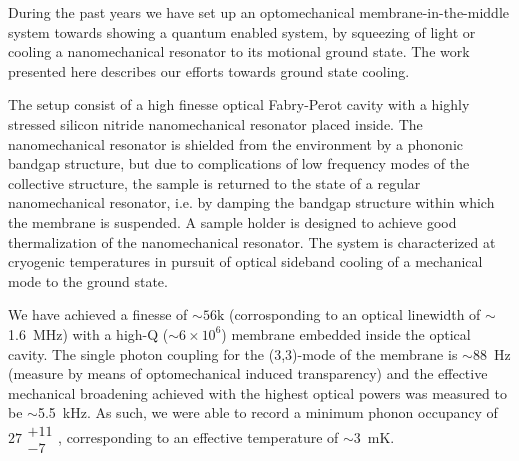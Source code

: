 During the past years we have set up an optomechanical membrane-in-the-middle system towards showing a quantum enabled system, by squeezing of light or cooling a nanomechanical resonator to its motional ground state. The work presented here describes our efforts towards ground state cooling.

The setup consist of a high finesse optical Fabry-Perot cavity with a highly stressed silicon nitride nanomechanical resonator placed inside. The nanomechanical resonator is shielded from the environment by a phononic bandgap structure, but due to complications of low frequency modes of the collective structure, the sample is returned to the state of a regular nanomechanical resonator, i.e. by damping the bandgap structure within which the membrane is suspended. A sample holder is designed to achieve good thermalization of the nanomechanical resonator. The system is characterized at cryogenic temperatures in pursuit of optical sideband cooling of a mechanical mode to the ground state.

We have achieved a finesse of $\sim56\mathrm{k}$ (corrosponding to an optical linewidth of $\sim$\SI{1.6}{\mega\hertz}) with a high-Q ($\sim6\times10^6$) membrane embedded inside the optical cavity. The single photon coupling for the (3,3)-mode of the membrane is $\sim$\SI{88}{\hertz} (measure by means of optomechanical induced transparency) and the effective mechanical broadening achieved with the highest optical powers was measured to be $\sim$\SI{5.5}{\kilo\hertz}. As such, we were able to record a minimum phonon occupancy of $27\substack{+11 \\ -7}$, corresponding to an effective temperature of $\sim$\SI{3}{\milli\kelvin}.